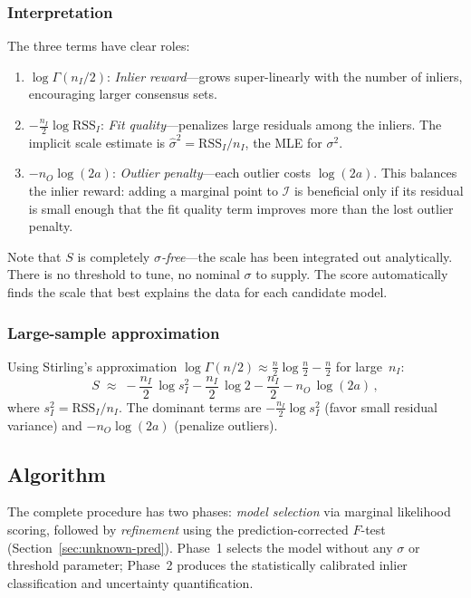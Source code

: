 \documentclass[11pt]{article}
\begin{document}
\subsubsection{Interpretation}

The three terms have clear roles:
\begin{enumerate}
  \item $\log\Gamma(n_I/2)$: \emph{Inlier reward}---grows super-linearly
    with the number of inliers, encouraging larger consensus sets.
  \item $-\frac{n_I}{2}\log\mathrm{RSS}_I$: \emph{Fit quality}---penalizes
    large residuals among the inliers.  The implicit scale estimate is
    $\hat\sigma^2 = \mathrm{RSS}_I / n_I$, the MLE for $\sigma^2$.
  \item $-n_O\log(2a)$: \emph{Outlier penalty}---each outlier costs
    $\log(2a)$.  This balances the inlier reward: adding a marginal
    point to $\mathcal{I}$ is beneficial only if its residual is small
    enough that the fit quality term improves more than the lost
    outlier penalty.
\end{enumerate}

\noindent Note that $S$ is completely \emph{$\sigma$-free}---the scale
has been integrated out analytically.  There is no threshold to tune,
no nominal $\sigma$ to supply.  The score automatically finds the
scale that best explains the data for each candidate model.

\subsubsection{Large-sample approximation}

Using Stirling's approximation $\log\Gamma(n/2) \approx
\frac{n}{2}\log\frac{n}{2} - \frac{n}{2}$ for large~$n_I$:
\begin{equation}
  S \;\approx\; -\frac{n_I}{2}\,\log s_I^2
    - \frac{n_I}{2}\,\log 2
    - \frac{n_I}{2}
    - n_O\, \log(2a)\,,
\end{equation}
where $s_I^2 = \mathrm{RSS}_I / n_I$.  The dominant terms are
$-\frac{n_I}{2}\log s_I^2$ (favor small residual variance) and
$-n_O\log(2a)$ (penalize outliers).

\subsection{Algorithm}
\label{sec:algorithm}

The complete procedure has two phases: \emph{model selection} via
marginal likelihood scoring, followed by \emph{refinement} using the
prediction-corrected $F$-test (Section~\ref{sec:unknown-pred}).
Phase~1 selects the model without any $\sigma$ or threshold
parameter; Phase~2 produces the statistically calibrated inlier
classification and uncertainty quantification.
\end{document}
